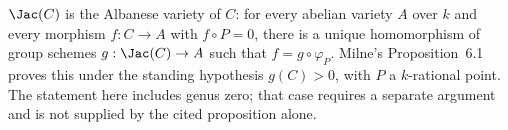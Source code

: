 \begin{theorem}
  \label{thm:exists_unique_ofCurve_comp}
  \(\Jac(C)\) is the Albanese variety of \(C\): for every abelian variety \(A\) over \(k\) and every
  morphism \(f : C \to A\) with \(f \circ P = 0\), there is a unique homomorphism of group schemes
  \(g : \Jac(C) \to A\) such that \(f = g \circ \varphi_P\).  Milne's Proposition~6.1
  proves this under the standing hypothesis \(g(C)>0\), with \(P\) a \(k\)-rational point.
  The statement here includes genus zero; that case requires a separate argument and is not
  supplied by the cited proposition alone.
\end{theorem}
